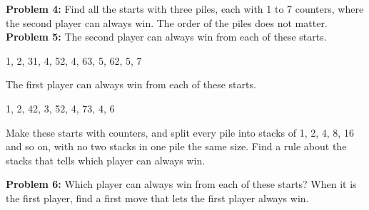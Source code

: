 \documentclass[12pt]{extarticle}
\newcommand{\prob}[1]{\textbf{Problem #1:}}
\begin{document}
\prob{4} Find all the starts with three piles, each with 1 to 7 counters, where the second player can always win. The order of the piles does not matter.
\newpage
\prob{5} The second player can always win from each of these starts.
\begin{center}1, 2, 3\hspace{0.45in}1, 4, 5\hspace{0.45in}2, 4, 6\hspace{0.45in}3, 5, 6\hspace{0.45in}2, 5, 7\end{center}
The first player can always win from each of these starts.
\begin{center}1, 2, 4\hspace{0.45in}2, 3, 5\hspace{0.45in}2, 4, 7\hspace{0.45in}3, 4, 6\end{center}
Make these starts with counters, and split every pile into stacks of 1, 2, 4, 8, 16 and so on, with no two stacks in one pile the same size. Find a rule about the stacks that tells which player can always win.

\vspace{4.0in}

\prob{6} Which player can always win from each of these starts? When it is the first player, find a first move that lets the first player always win.

\vspace{0.3in}
\noindent\hspace{0.3in}

\vspace{0.32in}
\noindent\hspace{0.3in}

\vspace{0.32in}
\noindent\hspace{0.3in}
\end{document}
